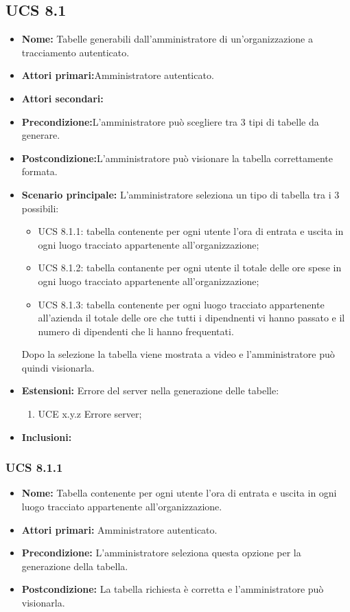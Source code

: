 \subsection{UCS 8.1}%
\begin{itemize}
\item \textbf{Nome:} Tabelle generabili dall'amministratore di un'organizzazione a tracciamento autenticato.
\item \textbf{Attori primari:}Amministratore autenticato.
\item \textbf{Attori secondari:}%
\item \textbf{Precondizione:}L'amministratore può scegliere tra 3 tipi di tabelle da generare.
\item \textbf{Postcondizione:}L'amministratore può visionare la tabella correttamente formata.
\item \textbf{Scenario principale:} L'amministratore seleziona un tipo di tabella tra i 3 possibili:
	\begin{itemize}%
	\item UCS 8.1.1: tabella contenente per ogni utente l'ora di entrata e uscita in ogni luogo tracciato appartenente all'organizzazione;
	\item UCS 8.1.2: tabella contanente per ogni utente il totale delle ore spese in ogni luogo tracciato appartenente all'organizzazione;
	\item UCS 8.1.3: tabella contenente per ogni luogo tracciato appartenente all'azienda il totale delle ore che tutti i dipendnenti vi hanno passato e il numero di dipendenti che li hanno frequentati.
\end{itemize}
Dopo la selezione la tabella viene mostrata a video e l'amministratore può quindi visionarla.
\item \textbf{Estensioni:} Errore del server nella generazione delle tabelle:
	\begin{enumerate}
		\item UCE x.y.z Errore server;
	\end{enumerate}
\item \textbf{Inclusioni:}
\end{itemize}

\subsubsection{UCS 8.1.1}%
\begin{itemize}
\item \textbf{Nome:} Tabella contenente per ogni utente l'ora di entrata e uscita in ogni luogo tracciato appartenente all'organizzazione.
\item \textbf{Attori primari:} Amministratore autenticato.
\item \textbf{Precondizione:} L'amministratore seleziona questa opzione per la generazione della tabella.
\item \textbf{Postcondizione:} La tabella richiesta è corretta e l'amministratore può visionarla.
\end{itemize}

